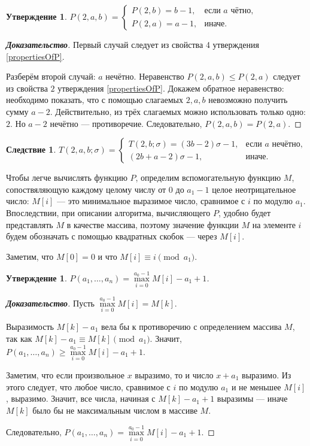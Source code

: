 \documentclass[12pt]{article}
\newtheorem{proposition}[theorem]{Утверждение}
\newtheorem{corollary}[theorem]{Следствие}
\begin{document}
\begin{proposition}
$P(2, a, b) = \begin{cases}
P(2, b) = b - 1, &\text{если $a$ чётно,} \\
P(2, a) = a - 1,&\text{иначе.}
\end{cases}$
\end{proposition}
\begin{proof}[\textbf{Доказательство}]
Первый случай следует из свойства 4 утверждения \ref{propertiesOfP}.

Разберём второй случай: $a$ нечётно. Неравенство $P(2, a, b) \le P(2, a)$ следует из свойства $2$ утверждения \ref{propertiesOfP}. Докажем обратное неравенство: необходимо показать, что с помощью слагаемых $2, a, b$ невозможно получить сумму $a - 2$. Действительно, из трёх слагаемых можно использовать только одно: $2$. Но $a - 2$ нечётно --- противоречие. Следовательно, $P(2, a, b) = P(2, a)$.
\end{proof}

\begin{corollary}
$T(2, a, b; \sigma) = \begin{cases}
T(2, b; \sigma) = (3b - 2)\sigma - 1, &\text{если $a$ нечётно,} \\
(2b + a - 2)\sigma - 1, &\text{иначе.}
\end{cases}$
\end{corollary}

Чтобы легче вычислять функцию $P$, определим вспомогательную функцию $M$, сопоствяляющую каждому целому числу от $0$ до $a_1 - 1$ целое неотрицательное число: $M[i]$ --- это минимальное выразимое число, сравнимое с $i$ по модулю $a_1$. Впоследствии, при описании алгоритма, вычисляющего $P$, удобно будет представлять $M$ в качестве массива, поэтому значение функции $M$ на элементе $i$ будем обозначать с помощью квадратных скобок --- через $M[i]$.

Заметим, что $M[0] = 0$ и что $M[i] \equiv i \pmod {a_1}$.

\begin{proposition}
\label{algorithm:lemma1}
$P(a_1, \dots, a_n) = \max\limits_{i = 0}^{a_0 - 1} M[i] - a_1 + 1$.
\end{proposition}
\begin{proof}[\textbf{Доказательство}]
Пусть $\max\limits_{i = 0}^{a_0 - 1} M[i] = M[k]$.

Выразимость $M[k] - a_1$ вела бы к противоречию с определением массива $M$, так как $M[k] - a_1 \equiv M[k] \pmod {a_1}$. Значит, $P(a_1, \dots, a_n) \ge \max\limits_{i = 0}^{a_0 - 1} M[i] - a_1 + 1$.

Заметим, что если произвольное $x$ выразимо, то и число $x + a_1$ выразимо. Из этого следует, что любое число, сравнимое с $i$ по модулю $a_1$ и не меньшее $M[i]$, выразимо. Значит, все числа, начиная с $M[k] - a_1 + 1$ выразимы --- иначе $M[k]$ было бы не максимальным числом в массиве $M$.

Следовательно, $P(a_1, \dots, a_n) = \max\limits_{i = 0}^{a_0 - 1} M[i] - a_1 + 1$.
\end{proof}
\end{document}
